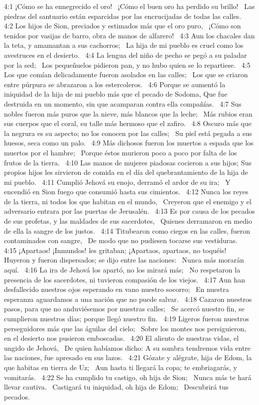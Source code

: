 4:1 ¡Cómo se ha ennegrecido el oro!  
¡Cómo el buen oro ha perdido su brillo!  
Las piedras del santuario están esparcidas por las encrucijadas de todas las calles.  
4:2 Los hijos de Sion, preciados y estimados más que el oro puro,  
¡Cómo son tenidos por vasijas de barro, obra de manos de alfarero!  
4:3 Aun los chacales dan la teta, y amamantan a sus cachorros;  
La hija de mi pueblo es cruel como los avestruces en el desierto.  
4:4 La lengua del niño de pecho se pegó a su paladar por la sed;  
Los pequeñuelos pidieron pan, y no hubo quien se lo repartiese.  
4:5 Los que comían delicadamente fueron asolados en las calles;  
Los que se criaron entre púrpura se abrazaron a los estercoleros.  
4:6 Porque se aumentó la iniquidad de la hija de mi pueblo más que el pecado de Sodoma, 
Que fue destruida en un momento, sin que acamparan contra ella compañías.  
4:7 Sus nobles fueron más puros que la nieve, más blancos que la leche;  
Más rubios eran sus cuerpos que el coral, su talle más hermoso que el zafiro.  
4:8 Oscuro más que la negrura es su aspecto; no los conocen por las calles;  
Su piel está pegada a sus huesos, seca como un palo.  
4:9 Más dichosos fueron los muertos a espada que los muertos por el hambre;  
Porque éstos murieron poco a poco por falta de los frutos de la tierra.  
4:10 Las manos de mujeres piadosas cocieron a sus hijos; 
Sus propios hijos les sirvieron de comida en el día del quebrantamiento de la hija de mi pueblo.  
4:11 Cumplió Jehová su enojo, derramó el ardor de su ira;  
Y encendió en Sion fuego que consumió hasta sus cimientos.  
4:12 Nunca los reyes de la tierra, ni todos los que habitan en el mundo,  
Creyeron que el enemigo y el adversario entrara por las puertas de Jerusalén.  
4:13 Es por causa de los pecados de sus profetas, y las maldades de sus sacerdotes,  
Quienes derramaron en medio de ella la sangre de los justos.  
4:14 Titubearon como ciegos en las calles, fueron contaminados con sangre,  
De modo que no pudiesen tocarse sus vestiduras.  
4:15 ¡Apartaos! ¡Inmundos! les gritaban; ¡Apartaos, apartaos, no toquéis!  
Huyeron y fueron dispersados; se dijo entre las naciones:  
Nunca más morarán aquí.  
4:16 La ira de Jehová los apartó, no los mirará más;  
No respetaron la presencia de los sacerdotes, ni tuvieron compasión de los viejos.  
4:17 Aun han desfallecido nuestros ojos esperando en vano nuestro socorro;  
En nuestra esperanza aguardamos a una nación que no puede salvar.  
4:18 Cazaron nuestros pasos, para que no anduviésemos por nuestras calles;  
Se acercó nuestro fin, se cumplieron nuestros días; porque llegó nuestro fin.  
4:19 Ligeros fueron nuestros perseguidores más que las águilas del cielo;  
Sobre los montes nos persiguieron, en el desierto nos pusieron emboscadas.  
4:20 El aliento de nuestras vidas, el ungido de Jehová,  
De quien habíamos dicho: A su sombra tendremos vida entre las naciones, fue apresado en sus lazos.  
4:21 Gózate y alégrate, hija de Edom, la que habitas en tierra de Uz;  
Aun hasta ti llegará la copa; te embriagarás, y vomitarás.  
4:22 Se ha cumplido tu castigo, oh hija de Sion;  
Nunca más te hará llevar cautiva.  
Castigará tu iniquidad, oh hija de Edom;  
Descubrirá tus pecados.  
